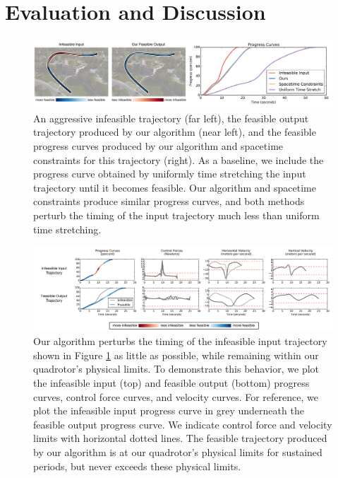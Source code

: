 \section{Evaluation and Discussion}
\label{sec:results}

\begin{figure}[t!]
\centering
\includegraphics[width=6.8in]{images/2016_siggraph/05_easing_curve_comparison.pdf}
\caption{
An aggressive infeasible trajectory (far left), the feasible output trajectory produced by our algorithm (near left), and the feasible progress curves produced by our algorithm and spacetime constraints for this trajectory (right).
As a baseline, we include the progress curve obtained by uniformly time stretching the input trajectory until it becomes feasible. Our algorithm and spacetime constraints produce similar progress curves, and both methods perturb the timing of the input trajectory much less than uniform time stretching.
}
\label{fig:easing}
\end{figure}

\begin{figure}[th!]
\centering
\includegraphics[width=6.8in]{images/2016_siggraph/06_easing_curve_comparison_3.pdf}
\caption{
Our algorithm perturbs the timing of the infeasible input trajectory shown in Figure \ref{fig:easing} as little as possible, while remaining within our quadrotor's physical limits.
To demonstrate this behavior, we plot the infeasible input (top) and feasible output (bottom) progress curves, control force curves, and velocity curves.
For reference, we plot the infeasible input progress curve in grey underneath the feasible output progress curve.
We indicate control force and velocity limits  with horizontal dotted lines.
The feasible trajectory produced by our algorithm is at our quadrotor's physical limits for sustained periods, but never exceeds these physical limits.
}
\label{fig:limits}
\end{figure}

